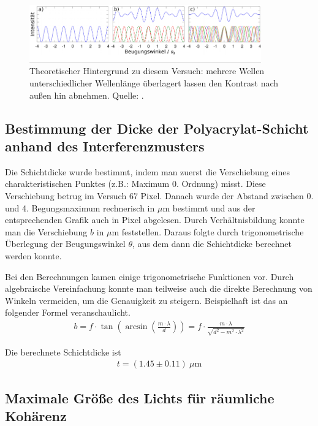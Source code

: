 \documentclass{article}
\begin{document}
\begin{figure}[H]
\caption{Theoretischer Hintergrund zu diesem Versuch: mehrere Wellen unterschiedlicher Wellenlänge überlagert lassen den Kontrast nach außen hin abnehmen. Quelle: \cite{quelle6}.}
\label{fig:versuch2_grundlagen}
\includegraphics[width=10cm]{diskussion1.png}
\end{figure}




\subsection{Bestimmung der Dicke der Polyacrylat-Schicht anhand des Interferenzmusters}

Die Schichtdicke wurde bestimmt, indem man zuerst die Verschiebung eines charakteristischen Punktes (z.B.: Maximum 0. Ordnung) misst. Diese Verschiebung betrug im Versuch 67 Pixel. Danach wurde der Abstand zwischen 0. und 4. Begungsmaximum rechnerisch in $\mu$m bestimmt und aus der entsprechenden Grafik auch in Pixel abgelesen. Durch Verhältnisbildung konnte man die Verschiebung $b$ in $\mu$m feststellen. Daraus folgte durch trigonometrische Überlegung der Beugungswinkel $\theta$, aus dem dann die Schichtdicke berechnet werden konnte.

Bei den Berechnungen kamen einige trigonometrische Funktionen vor. Durch algebraische Vereinfachung konnte man teilweise auch die direkte Berechnung von Winkeln vermeiden, um die Genauigkeit zu steigern. Beispielhaft ist das an folgender Formel veranschaulicht.
\begin{align*}
b = f\cdot \tan\left(\operatorname{arcsin}\left(\frac{m\cdot \lambda}{d}\right)\right) = f\cdot \frac{m\cdot \lambda}{\sqrt{d^2 - m^2\cdot \lambda^2}}
\end{align*}


Die berechnete Schichtdicke ist
\begin{align*}
t = (1.45\pm0.11)~\mu\text{m}
\end{align*}



\subsection{Maximale Größe des Lichts für räumliche Kohärenz}
\end{document}
